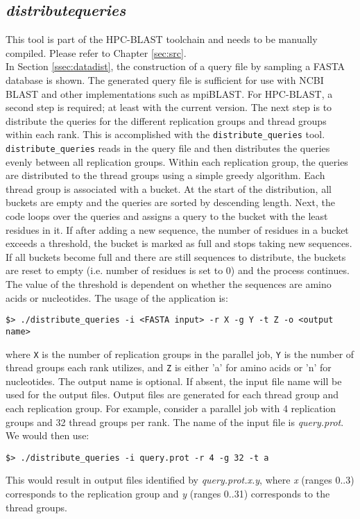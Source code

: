 \documentclass[10pt]{article}
\begin{document}
\subsection{\emph{distribute\textunderscore queries}} \label{ssec:distqueries}

 This tool is part of the HPC-BLAST toolchain and needs to be manually compiled.  Please refer to Chapter \ref{sec:src}.\\

In Section \ref{ssec:datadist}, the construction of a query file by sampling a FASTA database is shown.  The generated query file is sufficient for use with NCBI BLAST and other implementations such as mpiBLAST.  For HPC-BLAST, a second step is required; at
least with the current version.  The next step is to distribute the queries for the different replication groups and thread groups within each rank.  This is accomplished with the \verb^distribute_queries^ tool.  \verb^distribute_queries^ reads in the query file and then distributes
the queries evenly between all replication groups.  Within each replication group, the queries are distributed to the thread groups using a simple greedy algorithm.  Each thread group is associated with a bucket.  At the start of the distribution, all buckets are empty and
the queries are sorted by descending length.  Next, the code loops over the queries and assigns a query to the bucket with the least residues in it.  If after adding a new sequence, the number of residues in a bucket exceeds a threshold, the bucket is marked as full
and stops taking new sequences.  If all buckets become full and there are still sequences to distribute, the buckets are reset to empty (i.e. number of residues is set to 0) and the process continues.  The value of the threshold is dependent on whether the
sequences are amino acids or nucleotides.  The usage of the application is:
\begin{verbatim}
$> ./distribute_queries -i <FASTA input> -r X -g Y -t Z -o <output name>
\end{verbatim}
\noindent where \verb^X^ is the number of replication groups in the parallel job, \verb^Y^ is the number of thread groups each rank utilizes, and \verb^Z^ is either 'a' for amino acids or 'n' for nucleotides.  The output name is optional.  If absent, the input file name
will be used for the output files.  Output files are generated for each thread group and each replication group.  For example, consider a parallel job with 4 replication groups and 32 thread groups per rank.  The name of the input file is \emph{query.prot}. 
We would then use:
\begin{verbatim}
$> ./distribute_queries -i query.prot -r 4 -g 32 -t a
\end{verbatim}
\noindent This would result in output files identified by \emph{query.prot.x.y}, where \emph{x} (ranges 0..3) corresponds to the replication group and \emph{y} (ranges 0..31) corresponds to the thread groups.\\
\end{document}
